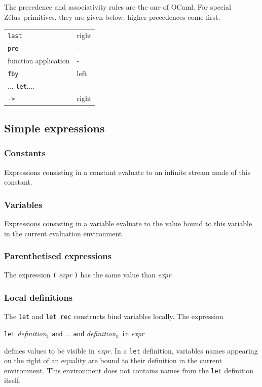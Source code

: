 \documentclass[11pt,titlepage,twoside]{report}
\newcommand{\zelus}{{\sf Z\'elus}}
\newcommand{\ocaml}{{\sf OCaml}}
\newcommand{\Let}{\mbox{{\tt let}}}
\newcommand{\Rec}{\mbox{{\tt rec}}}
\newcommand{\In}{\mbox{{\tt in}}}
\newcommand{\And}{\mbox{{\tt and}}}
\newcommand{\Pre}{\mbox{{\tt pre}}}
\newcommand{\Last}{\mbox{{\tt last}}}
\newcommand{\Fby}{\mbox{{\tt fby}}}
\newcommand{\Minusgreater}{\mbox{{\tt ->}}}
\newcommand{\term}[1]{{\tt #1}}
\newcommand{\nterm}[1]{{\em #1}}
\begin{document}
The precedence and associativity rules are the one of \ocaml. For
special \zelus\ primitives, they are given below:
higher precedences come first.
\begin{center}
{
\begin{tabular}{|l|l|} \hline
\Last                           & right         \\
\Pre                            & -             \\
function application            & -             \\
\Fby                            & left          \\
...
\Let,...                        & -             \\ 
\Minusgreater                   & right         \\ \hline
\end{tabular}
}
\end{center}

\subsection{Simple expressions}

\subsubsection{Constants}
Expressions consisting in a constant evaluate to an infinite stream
made of this constant.

\subsubsection{Variables}
Expressions consisting in a variable evaluate to the value bound to
this variable in the current evaluation environment.

\subsubsection{Parenthetised expressions}
The expression \term{(} \nterm{expr} \term{)} has the same value than
\nterm{expr}.


\subsubsection{Local definitions}
The \term{\Let} and \term{\Let\ \Rec} constructs bind variables
locally. The expression 
\begin{center}
  \term{\Let} \nterm{definition}$_1$ \term{\And} ... 
  \term{\And} \nterm{definition}$_n$ \term{\In} \nterm{expr}
\end{center}
defines values to be visible in \nterm{expr}. In a \term{\Let} definition,
variables names appearing on the right of an equality are bound to their definition
in the current environment. This environment does not contains names from
the \term{\Let} definition itself.
\end{document}
